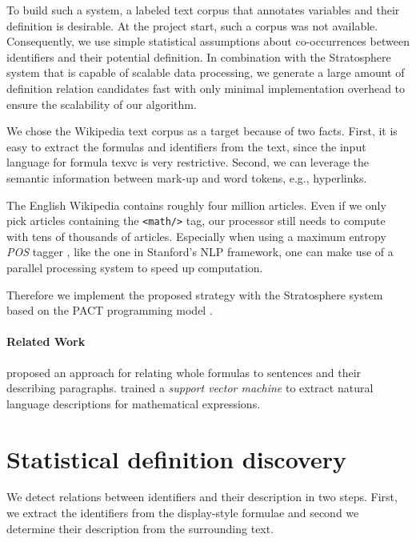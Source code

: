 \documentclass[runningheads]{llncs}
\begin{document}
To build such a system, a labeled text corpus that annotates variables
and their definition is desirable.
At the project start, such a corpus was not available.
Consequently, we use simple statistical assumptions about co-occurrences between identifiers
and their potential definition.
In combination with the Stratosphere system
that is capable of scalable data processing,  we generate a large amount of 
definition relation 
candidates fast with only minimal implementation overhead to ensure the scalability of our algorithm.

We chose the Wikipedia text corpus as a target because of two facts.
First, it is easy to extract the formulas and identifiers from the text,
since the input language for formula texvc is very restrictive.
Second, we can leverage the semantic information between mark-up and
word tokens, e.g., hyperlinks.

The English Wikipedia contains roughly four million articles.
Even if we only
pick articles containing the \texttt{<math/>} tag, our processor still needs
to compute with tens of thousands of articles.
Especially when using a maximum
entropy \emph{POS} tagger \cite{Rathna96}, like the one in Stanford's NLP
framework, one can make use of a parallel processing system to speed up
computation.

Therefore we implement the proposed strategy with the Stratosphere system based
on the PACT programming model \cite{Alexandrov2010}.


\paragraph{Related Work}
\citeauthor{Quoc2010} \cite{Quoc2010} proposed an approach for
relating whole formulas to sentences and their describing paragraphs.
\citeauthor{Yokoi} \cite{Yokoi} trained a \emph{support vector machine} to extract
natural language descriptions for mathematical expressions.


\section{Statistical definition discovery}
We detect relations between identifiers and their description in two steps.
First, we extract the identifiers from the display-style formulae and
second we determine their description from the surrounding text.
\end{document}
